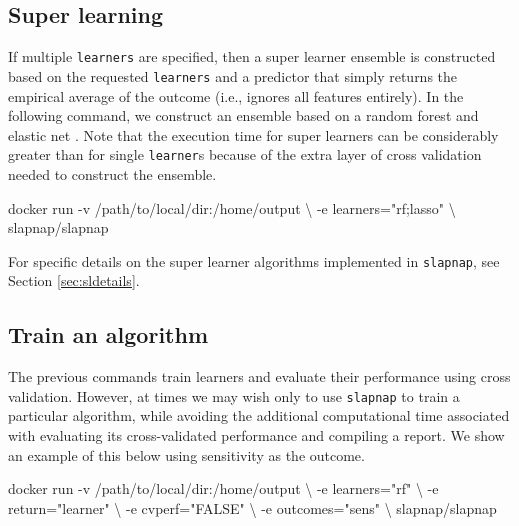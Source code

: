 \documentclass[]{article}
\newenvironment{Shaded}{\begin{snugshade}}{\end{snugshade}}
\newcommand{\StringTok}[1]{\textcolor[rgb]{0.31,0.60,0.02}{#1}}
\newcommand{\ExtensionTok}[1]{#1}
\newcommand{\NormalTok}[1]{#1}
\begin{document}
\subsection{Super learning}\label{super-learning}

If multiple \texttt{learners} are specified, then a super learner
ensemble \citep{vanderlaan2007} is constructed based on the requested
\texttt{learners} and a predictor that simply returns the empirical
average of the outcome (i.e., ignores all features entirely). In the
following command, we construct an ensemble based on a random forest
\citep{breiman2001} and elastic net \citep{zou2005}. Note that the
execution time for super learners can be considerably greater than for
single \texttt{learner}s because of the extra layer of cross validation
needed to construct the ensemble.

\begin{Shaded}
\begin{Highlighting}[]
\ExtensionTok{docker}\NormalTok{ run -v /path/to/local/dir:/home/output \textbackslash{}}
\NormalTok{           -e learners=}\StringTok{"rf;lasso"}\NormalTok{ \textbackslash{}}
\NormalTok{           slapnap/slapnap}
\end{Highlighting}
\end{Shaded}

For specific details on the super learner algorithms implemented in
\texttt{slapnap}, see Section \ref{sec:sldetails}.

\subsection{Train an algorithm}\label{train-an-algorithm}

The previous commands train learners and evaluate their performance
using cross validation. However, at times we may wish only to use
\texttt{slapnap} to train a particular algorithm, while avoiding the
additional computational time associated with evaluating its
cross-validated performance and compiling a report. We show an example
of this below using sensitivity as the outcome.

\begin{Shaded}
\begin{Highlighting}[]
\ExtensionTok{docker}\NormalTok{ run -v /path/to/local/dir:/home/output \textbackslash{}}
\NormalTok{           -e learners=}\StringTok{"rf"}\NormalTok{ \textbackslash{}}
\NormalTok{           -e return=}\StringTok{"learner"}\NormalTok{ \textbackslash{}}
\NormalTok{           -e cvperf=}\StringTok{"FALSE"}\NormalTok{ \textbackslash{}}
\NormalTok{           -e outcomes=}\StringTok{"sens"}\NormalTok{ \textbackslash{}}
\NormalTok{           slapnap/slapnap}
\end{Highlighting}
\end{Shaded}
\end{document}
